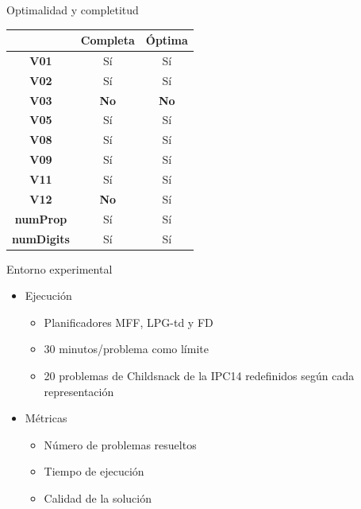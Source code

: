 \documentclass[xcolor=table]{beamer}
\begin{document}

\begin{frame}{Optimalidad y completitud}
    \begin{table}[]
\centering
\label{my-label}
\begin{tabular}{|c|c|c|}
\hline
\textbf{}          & \textbf{Completa} & \textbf{Óptima} \\ \hline
\textbf{V01}       & Sí                & Sí              \\ \hline
\textbf{V02}       & Sí                & Sí              \\ \hline
\textbf{V03}       & \textbf{No}                & \textbf{No}              \\ \hline
\textbf{V05}       & Sí                & Sí              \\ \hline
\textbf{V08}       & Sí                & Sí              \\ \hline
\textbf{V09}       & Sí                & Sí              \\ \hline
\textbf{V11}       & Sí                & Sí              \\ \hline
\textbf{V12}       & \textbf{No}                & Sí              \\ \hline
\textbf{numProp}   & Sí                & Sí              \\ \hline
\textbf{numDigits} & Sí                & Sí              \\ \hline
\end{tabular}
\end{table}
\end{frame}


\begin{frame}{Entorno experimental}
    \begin{itemize}
        \item Ejecución
        \begin{itemize}
            \item Planificadores MFF, LPG-td y FD
            \item 30 minutos/problema como límite
            \item 20 problemas de Childsnack de la IPC14 redefinidos según cada representación
        \end{itemize}
        \item Métricas
        \begin{itemize}
            \item Número de problemas resueltos
            \item Tiempo de ejecución
            \item Calidad de la solución
        \end{itemize}
    \end{itemize}
\end{frame}
\end{document}
